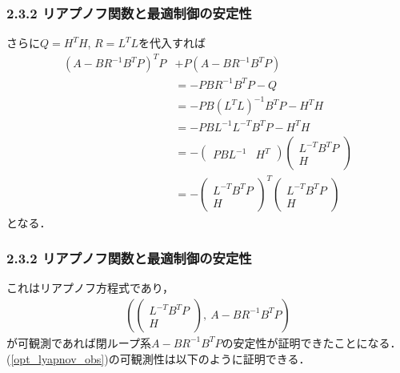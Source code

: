 \begin{frame}[t]
\frametitle{2.3.2 リアプノフ関数と最適制御の安定性}
さらに$Q=H^TH$, $R=L^TL$を代入すれば
\begin{align}
	(A - B R^{-1} B^T P )^T P &+ P(A-  B R^{-1} B^T P)
\nonumber \\
	&= - P B R^{-1} B^T P - Q
\nonumber \\
	&= - P B (L^T L)^{-1} B^T P - H^T H
\nonumber \\
	&= - P B L^{-1} L^{-T} B^T P - H^T H
\nonumber \\
	&= - \left(\begin{array}{cc} P B L^{-1} & H^T \end{array}\right)
		\left(\begin{array}{c} L^{-T} B^T P \\ H \end{array}\right)
\nonumber \\
	&= - \left(\begin{array}{c} L^{-T} B^T P \\ H \end{array}\right)^T
		\left(\begin{array}{c} L^{-T} B^T P \\ H \end{array}\right)
\end{align}
となる．
\end{frame}

\begin{frame}[t]
\frametitle{2.3.2 リアプノフ関数と最適制御の安定性}
これはリアプノフ方程式であり，
\begin{align}
	\left( \left(\begin{array}{c} L^{-T} B^T P \\ H \end{array}\right), \ A - B R^{-1} B^T P \right)
\label{opt_lyapnov_obs}
\end{align}
が可観測であれば閉ループ系$A - B R^{-1} B^T P$の安定性が証明できたことになる．(\ref{opt_lyapnov_obs})の可観測性は以下のように証明できる．
\end{frame}

